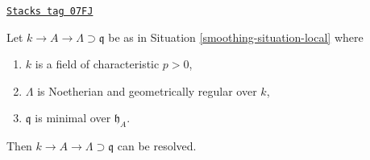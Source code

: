 \begin{lemma}
\label{smoothing-lemma-resolve-general}
\href{https://stacks.math.columbia.edu/tag/07FJ}{\texttt{Stacks tag 07FJ}}

Let $k \to A \to \Lambda \supset \mathfrak q$ be as in
Situation \ref{smoothing-situation-local} where
\begin{enumerate}
\item $k$ is a field of characteristic $p > 0$,
\item $\Lambda$ is Noetherian and geometrically regular over $k$,
\item $\mathfrak q$ is minimal over $\mathfrak h_A$.
\end{enumerate}
Then $k \to A \to \Lambda \supset \mathfrak q$ can be resolved.
\end{lemma}

